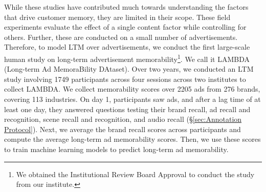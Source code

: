 While these studies have contributed much towards understanding the factors that drive customer memory, they are limited in their scope. These field experiments evaluate the effect of a single content factor while controlling for others. Further, these are conducted on a small number of advertisements.%
Therefore, to model LTM over advertisements, we conduct the first large-scale human study on long-term advertisement memorability\footnote{We obtained the Institutional Review Board Approval to conduct the study from our institute.}. We call it LAMBDA (Long-term Ad MemoraBility DAtaset). Over two years, we conducted an LTM study involving 1749 participants across four sessions across two institutes to collect LAMBDA. We collect memorability scores over 2205 ads from 276 brands, covering 113 industries. On day 1, participants saw ads, and after a lag time of at least one day, they answered questions testing their brand recall, ad recall and recognition, scene recall and recognition, and audio recall (\S\ref{sec:Annotation Protocol}). Next, we average the brand recall scores across participants and compute the average long-term ad memorability scores. Then, we use these scores to train machine learning models to predict long-term ad memorability.



